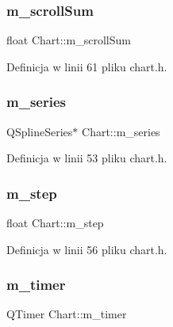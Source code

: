 \subsubsection{\texorpdfstring{m\+\_\+scroll\+Sum}{m\_scrollSum}}
{\footnotesize\ttfamily float Chart\+::m\+\_\+scroll\+Sum\hspace{0.3cm}{\ttfamily [private]}}



Definicja w linii 61 pliku chart.\+h.

\mbox{\label{class_chart_a6dcaf24ec43e6521ba3046a98545b9a6}} 
\subsubsection{\texorpdfstring{m\+\_\+series}{m\_series}}
{\footnotesize\ttfamily Q\+Spline\+Series$\ast$ Chart\+::m\+\_\+series\hspace{0.3cm}{\ttfamily [private]}}



Definicja w linii 53 pliku chart.\+h.

\mbox{\label{class_chart_a1a75b604ca836461e0693e344419442b}} 
\subsubsection{\texorpdfstring{m\+\_\+step}{m\_step}}
{\footnotesize\ttfamily float Chart\+::m\+\_\+step\hspace{0.3cm}{\ttfamily [private]}}



Definicja w linii 56 pliku chart.\+h.

\mbox{\label{class_chart_a0537ed43bfbba8ae3c90bd2fd01924e9}} 
\subsubsection{\texorpdfstring{m\+\_\+timer}{m\_timer}}
{\footnotesize\ttfamily Q\+Timer Chart\+::m\+\_\+timer\hspace{0.3cm}{\ttfamily [private]}}



